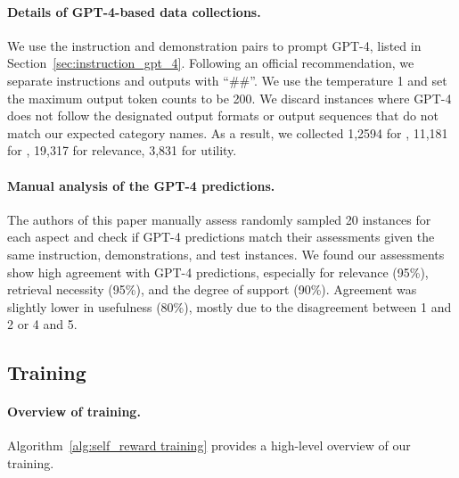 \paragraph{Details of GPT-4-based data collections.} 
We use the instruction and demonstration pairs to prompt GPT-4, listed in Section~\ref{sec:instruction_gpt_4}. 
Following an official recommendation, we separate instructions and outputs with ``\#\#''. 
We use the temperature 1 and set the maximum output token counts to be 200. 
We discard instances where GPT-4 does not follow the designated output formats or output sequences that do not match our expected category names. 
As a result, we collected 1,2594 for \ret, 11,181 for \cgr, 19,317 for relevance, 3,831 for utility.  

\paragraph{Manual analysis of the GPT-4 predictions.}
The authors of this paper manually assess randomly sampled 20 instances for each aspect and check if GPT-4 predictions match their assessments given the same instruction, demonstrations, and test instances. 
We found our assessments show high agreement with GPT-4 predictions, especially for relevance (95\%), retrieval necessity (95\%), and the degree of support (90\%). Agreement was slightly lower in usefulness (80\%), mostly due to the disagreement between 1 and 2 or 4 and 5.   

\subsection{\model Training}
\paragraph{Overview of training.}
Algorithm~\ref{alg:self_reward training} provides a high-level overview of our training. 



